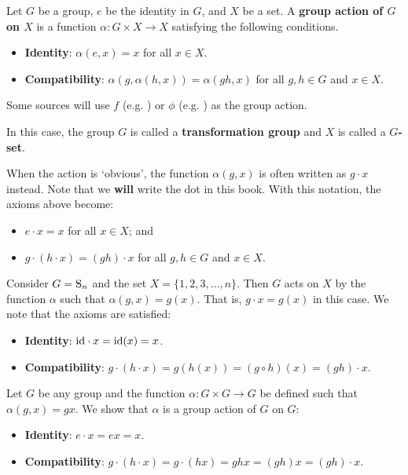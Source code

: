 \begin{definition}\label{definition-group-action}
    Let $G$ be a group, $e$ be the identity in $G$, and $X$ be a set. A \textbf{group action of $G$ on $X$} is a function $\alpha: G \times X \to X$ satisfying the following conditions.
    \begin{itemize}
        \item \textbf{Identity}: $\alpha(e, x) = x$ for all $x \in X$.
        \item \textbf{Compatibility}: $\alpha(g, \alpha(h, x)) = \alpha(gh, x)$ for all $g, h \in G$ and $x \in X$.
    \end{itemize}
\end{definition}
\begin{remark}
    Some sources will use $f$ (e.g. \cite{brilliant_groupactions}) or $\phi$ (e.g. \cite{rowland_groupaction}) as the group action.
\end{remark}
In this case, the group $G$ is called a \textbf{transformation group} and $X$ is called a \textbf{$G$-set}.

When the action is `obvious', the function $\alpha(g, x)$ is often written as $g \cdot x$ instead. Note that we \textbf{will} write the dot in this book. With this notation, the axioms above become:
\begin{itemize}
    \item $e \cdot x = x$ for all $x \in X$; and
    \item $g \cdot (h \cdot x) = (gh) \cdot x$ for all $g, h \in G$ and $x \in X$.
\end{itemize}

\begin{example}
    Consider $G = \mathrm{S}_{n}$ and the set $X = \{1, 2, 3, \dots, n\}$. Then $G$ acts on $X$ by the function $\alpha$ such that $\alpha(g, x) = g(x)$. That is, $g \cdot x = g(x)$ in this case. We note that the axioms are satisfied:
    \begin{itemize}
        \item \textbf{Identity}: $\mathrm{id} \cdot x = \mathrm{id}(x) = x$.
        \item \textbf{Compatibility}: $g \cdot (h \cdot x) = g(h(x)) = (g \circ h)(x) = (gh) \cdot x$.
    \end{itemize}
\end{example}

\begin{example}
    Let $G$ be any group and the function $\alpha: G\times G \to G$ be defined such that $\alpha(g, x) = gx$. We show that $\alpha$ is a group action of $G$ on $G$:
    \begin{itemize}
        \item \textbf{Identity}: $e\cdot x = ex = x$.
        \item \textbf{Compatibility}: $g \cdot (h\cdot x) = g \cdot (hx) = ghx = (gh)x = (gh) \cdot x$.
    \end{itemize}
\end{example}

